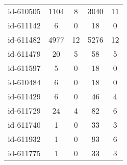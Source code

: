 \begin{tabular}{ccccc}
id-610505 & 1104 & 8 & 3040 & 11\\
id-611142 & 6 & 0 & 18 & 0\\
id-611482 & 4977 & 12 & 5276 & 12\\
id-611479 & 20 & 5 & 58 & 5\\
id-611597 & 5 & 0 & 18 & 0\\
id-610484 & 6 & 0 & 18 & 0\\
id-611429 & 6 & 0 & 46 & 4\\
id-611729 & 24 & 4 & 82 & 6\\
id-611740 & 1 & 0 & 33 & 3\\
id-611932 & 1 & 0 & 93 & 6\\
id-611775 & 1 & 0 & 33 & 3\\
\end{tabular}
